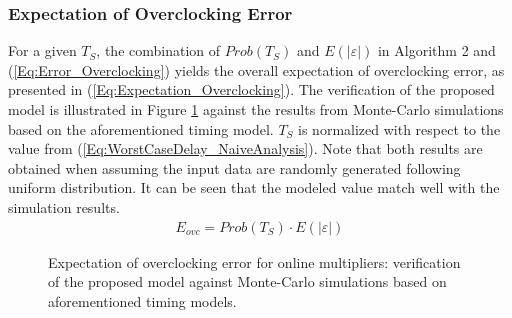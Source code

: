 \documentclass{acm_proc_article-sp}
\begin{document}
\subsubsection{Expectation of Overclocking Error}
For a given $T_S$, the combination of $Prob(T_S)$ and $E(|\varepsilon|)$ in Algorithm 2 and (\ref{Eq:Error_Overclocking}) yields the overall expectation of overclocking error, as presented in (\ref{Eq:Expectation_Overclocking}). The verification of the proposed model is illustrated in Figure \ref{Fig:ModelVerification} against the results from Monte-Carlo simulations based on the aforementioned timing model. $T_S$ is normalized with respect to the value from (\ref{Eq:WorstCaseDelay_NaiveAnalysis}). Note that both results are obtained when assuming the input data are randomly generated following uniform distribution. It can be seen that the modeled value match well with the simulation results.
%
\begin{eqnarray}\label{Eq:Expectation_Overclocking}
  E_{ovc}=Prob(T_S)\cdot E(|\varepsilon|)
\end{eqnarray}

\begin{figure}[t]
  \centering
  \vspace{-2ex}
  \caption{Expectation of overclocking error for online multipliers: verification of the proposed model against Monte-Carlo simulations based on aforementioned timing models.}
  \label{Fig:ModelVerification}
  \vspace{-2ex}
\end{figure}
\end{document}

